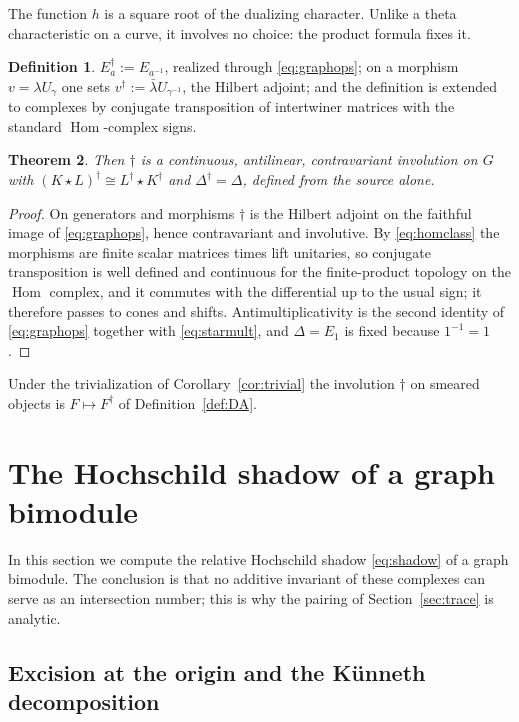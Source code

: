 \documentclass[11pt]{amsart}
\newtheorem{theorem}{Theorem}[section]
\theoremstyle{definition}
\newtheorem{definition}[theorem]{Definition}
\theoremstyle{remark}
\newcommand{\Hom}{\operatorname{Hom}}
\begin{document}
The function $h$ is a square root of the dualizing character.  Unlike a theta
characteristic on a curve, it involves no choice: the product formula fixes
it.

\begin{definition}\label{def:dagger}
$E_a^{\dagger}:=E_{a^{-1}}$, realized through \eqref{eq:graphops}; on a
morphism $v=\lambda U_{\gamma}$ one sets $v^{\dagger}:=\bar\lambda
U_{\gamma^{-1}}$, the Hilbert adjoint; and the definition is extended to
complexes by conjugate transposition of intertwiner matrices with the standard
$\Hom$-complex signs.
\end{definition}

\begin{theorem}\label{thm:daggerthm}
Then $\dagger$ is a continuous, antilinear,
contravariant involution on $G$ with $(K\star L)^{\dagger}\cong
L^{\dagger}\star K^{\dagger}$ and $\Delta^{\dagger}=\Delta$, defined from the
source alone.
\end{theorem}

\begin{proof}
On generators and morphisms $\dagger$ is the Hilbert adjoint on the faithful
image of \eqref{eq:graphops}, hence contravariant and involutive.  By
\eqref{eq:homclass} the morphisms are finite scalar matrices times lift
unitaries, so conjugate transposition is well defined and continuous for the
finite-product topology on the $\Hom$ complex, and it commutes with the
differential up to the usual sign; it therefore passes to cones and shifts.
Antimultiplicativity is the second identity of \eqref{eq:graphops} together
with \eqref{eq:starmult}, and $\Delta=E_1$ is fixed because $1^{-1}=1$.
\end{proof}

Under the trivialization of Corollary~\ref{cor:trivial} the involution
$\dagger$ on smeared objects is $F\mapsto F^{\dagger}$ of
Definition~\ref{def:DA}.

\section{The Hochschild shadow of a graph bimodule}\label{sec:shadow}

In this section we compute the relative Hochschild shadow \eqref{eq:shadow} of
a graph bimodule.  The conclusion is that no additive invariant of these
complexes can serve as an intersection number; this is why the pairing of
Section~\ref{sec:trace} is analytic.

\subsection{Excision at the origin and the K\"unneth decomposition}
\end{document}
